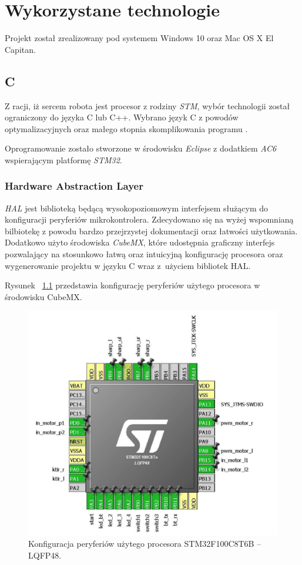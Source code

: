 \chapter{Wykorzystane technologie}

Projekt został zrealizowany pod systemem Windows 10 oraz Mac OS X El Capitan. 

\section{C}
Z racji, iż sercem robota jest procesor z rodziny \textit{STM}, wybór technologii został ograniczony do języka C lub C++. Wybrano język C z powodów optymalizacyjnych oraz małego stopnia skomplikowania programu \cite{C}. 


Oprogramowanie zostało stworzone w środowisku \textit{Eclipse} z dodatkiem \textit{AC6} wspierającym platformę \textit{STM32}.

\subsection{Hardware Abstraction Layer}
\textit{HAL} jest biblioteką będącą wysokopoziomowym interfejsem służącym do konfiguracji peryferiów mikrokontrolera. Zdecydowano się na wyżej wspomnianą bilbiotekę z powodu bardzo przejrzystej dokumentacji oraz łatwości użytkowania. Dodatkowo użyto środowiska \textit{CubeMX}, które udostępnia graficzny interfejs pozwalający na stosunkowo łatwą oraz intuicyjną konfigurację procesora oraz wygenerowanie projektu w języku C wraz z~użyciem bibliotek HAL.

\newpage 

Rysunek ~\ref{fig:cubemx} przedstawia konfigurację peryferiów użytego procesora w środowisku CubeMX.   

\begin{figure}[H]
	\centering
		\includegraphics[width=\linewidth, scale=0.95]{pic02/cubemx}
	\caption{Konfiguracja peryferiów użytego procesora STM32F100C8T6B – LQFP48.}
	\label{fig:cubemx}	
\end{figure}

